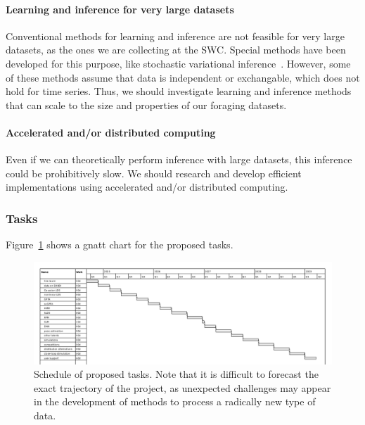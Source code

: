 \paragraph{Learning and inference for very large datasets}

Conventional methods for learning and inference are not feasible for very large
datasets, as the ones we are collecting at the SWC. Special methods have been
developed for this purpose, like stochastic variational
inference~\citep{hoffmanEtAl13}. However, some of these methods assume that
data is independent or exchangable, which does not hold for time series. Thus,
we should investigate learning and inference methods that can scale to the size
and properties of our foraging datasets.

\paragraph{Accelerated and/or distributed computing}

Even if we can theoretically perform inference with large datasets, this
inference could be prohibitively slow. We should research and develop efficient
implementations using accelerated and/or distributed computing.

\subsubsection{Tasks}

Figure~\ref{fig:gnattChart} shows a gnatt chart for the proposed tasks.

\begin{figure}
    \centering
    \includegraphics[width=5in]{figures/bbr24TasksCropped.png}

    \caption{Schedule of proposed tasks. Note that it is difficult to forecast
    the exact trajectory of the project, as unexpected challenges may appear in
    the development of methods to process a radically new type of data.}

    \label{fig:gnattChart}
\end{figure}

